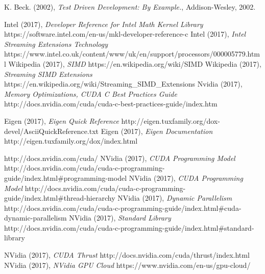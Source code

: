 \documentclass[a4paper]{amsart}
\begin{document}
\begin{thebibliography}{99}
 K. Beck. (2002), {\em Test Driven Development: By Example.}, Addison-Wesley, 2002.

 Intel (2017), {\em Developer Reference for Intel Math Kernel Library} https://software.intel.com/en-us/mkl-developer-reference-c
 Intel (2017), {\em Intel Streaming Extensions Technology} https://www.intel.co.uk/content/www/uk/en/support/processors/000005779.html
 Wikipedia (2017), {\em SIMD} https://en.wikipedia.org/wiki/SIMD
 Wikipedia (2017), {\em Streaming SIMD Extensions} https://en.wikipedia.org/wiki/Streaming\_SIMD\_Extensions
 Nvidia (2017), {\em Memory Optimizations, CUDA C Best Practices Guide} http://docs.nvidia.com/cuda/cuda-c-best-practices-guide/index.htm

 Eigen (2017), {\em Eigen Quick Reference} http://eigen.tuxfamily.org/dox-devel/AsciiQuickReference.txt
 Eigen (2017), {\em Eigen Documentation} http://eigen.tuxfamily.org/dox/index.html


http://docs.nvidia.com/cuda/
 NVidia (2017), {\em CUDA Programming Model} http://docs.nvidia.com/cuda/cuda-c-programming-guide/index.html\#programming-model
 NVidia (2017), {\em CUDA Programming Model} http://docs.nvidia.com/cuda/cuda-c-programming-guide/index.html\#thread-hierarchy
 NVidia (2017), {\em Dynamic Parallelism} http://docs.nvidia.com/cuda/cuda-c-programming-guide/index.html\#cuda-dynamic-parallelism
 NVidia (2017), {\em Standard Library} http://docs.nvidia.com/cuda/cuda-c-programming-guide/index.html\#standard-library

 NVidia (2017), {\em CUDA Thrust} http://docs.nvidia.com/cuda/thrust/index.html
 NVidia (2017), {\em NVidia GPU Cloud} https://www.nvidia.com/en-us/gpu-cloud/


\end{thebibliography}
\end{document}
